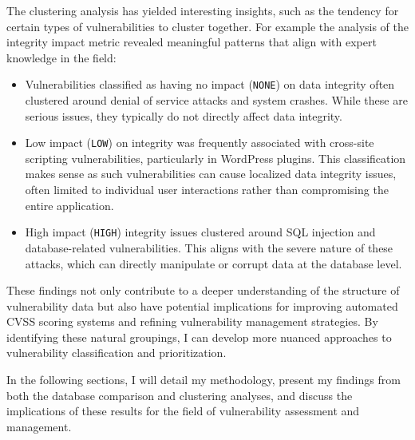 \documentclass[12pt]{article}
\begin{document}
The clustering analysis has yielded interesting insights, such as the tendency for certain types of
vulnerabilities to cluster together. For example the analysis of the integrity impact metric revealed meaningful patterns that align with expert knowledge in the field:

\begin{itemize}

	\item Vulnerabilities classified as having no impact (\texttt{NONE}) on data integrity often
	      clustered around denial of service attacks and system crashes. While these are serious
	      issues, they typically do not directly affect data integrity.

	\item Low impact (\texttt{LOW}) on integrity was frequently associated with cross-site scripting
	      vulnerabilities, particularly in WordPress plugins. This classification makes sense as such
	      vulnerabilities can cause localized data integrity issues, often limited to individual user
	      interactions rather than compromising the entire application.

	\item High impact (\texttt{HIGH}) integrity issues clustered around SQL injection and
	      database-related vulnerabilities. This aligns with the severe nature of these attacks, which
	      can directly manipulate or corrupt data at the database level.

\end{itemize}


These findings not only contribute to a deeper understanding of the structure of vulnerability data
but also have potential implications for improving automated CVSS scoring systems and refining
vulnerability management strategies. By identifying these natural groupings, I can develop more
nuanced approaches to vulnerability classification and prioritization.

In the following sections, I will detail my methodology, present my findings from both the
database comparison and clustering analyses, and discuss the implications of these results for the
field of vulnerability assessment and management.
\end{document}
